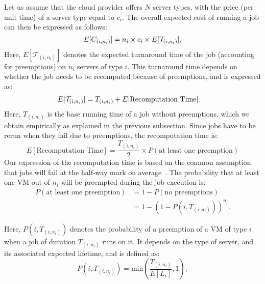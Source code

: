 
Let us assume that the cloud provider offers $N$ server types, with the price (per unit time) of a server type equal to $c_i$. 
The overall expected cost of running a job can then be expressed as follows:
\begin{equation}
  \label{eq:e-cost}
\vspace*{\eqnspace}
  E[C_{( i,n_i )}] = n_i\times c_i \times E[\mathcal{T}_{( i,n_i )}].
\end{equation}
Here, $E[\mathcal{T}_{( i,n_i )}]$ denotes the expected turnaround time of the job (accounting for preemptions) on $n_i$ servers of type $i$.
%
This turnaround time depends on whether the job needs to be recomputed because of preemptions, and is expressed as:
\begin{align}
  \label{eq:turnaround}
  \vspace*{\eqnspace}
  E[\mathcal{T}_{( i,n_i )}] &= T_{( i,n_i )} + E[\text{Recomputation Time}].
\end{align}
Here, $T_{( i,n_i )}$ is the base running time of a job without preemptions, which we obtain empirically as explained in the previous subsection.
Since jobs have to be rerun when they fail due to preemptions, the recomputation time is:
\begin{equation}
  \label{eq:recomput}
   E[\text{Recomputation Time}] = \frac{T_{( i,n_i )}}{2} \times P(\text{at least one preemption})
 \end{equation}
 Our expression of the recomputation time is based on the common assumption that jobs will fail at the half-way mark on average~\cite{daly2006higher, bougeret_checkpointing_2011}. 
%
 The probability that at least one VM out of $n_i$ will be preempted during the job execution is:
\begin{align}
  \label{eq:pfail1}
  P(\text{at least one preemption}) &= 1-P(\text{no preemptions}) \\
                                 &= 1-\left(1-P\left(i,T_{(i, n_i)}\right)\right)^{n_i}.
\end{align}

Here, $P(i, T_{(i, n_i)})$ denotes the probability of a preemption of a VM of type $i$ when a job of duration $T_{(i, n_i)}$ runs on it. 
%
It depends on the type of server, and its associated expected lifetime, and is defined as:
\begin{equation}
  \label{eq:pi}
  P\left(i, T_{\left(i, n_i \right)}\right) = \text{min}\left(\dfrac{T_{(i, n_i)}}{E[L_i]}, 1\right),
\end{equation}

